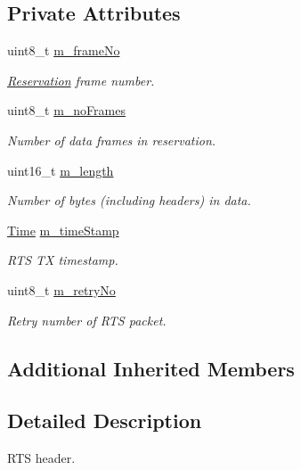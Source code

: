 \subsection*{Private Attributes}
\begin{DoxyCompactItemize}
\item 
uint8\+\_\+t \hyperlink{classns3_1_1UanHeaderRcRts_ad6ee10b951e81197f4258b85fb5958ee}{m\+\_\+frame\+No}
\begin{DoxyCompactList}\small\item\em \hyperlink{classns3_1_1Reservation}{Reservation} frame number. \end{DoxyCompactList}\item 
uint8\+\_\+t \hyperlink{classns3_1_1UanHeaderRcRts_a809efa819ec8e806c318b4a051206eea}{m\+\_\+no\+Frames}
\begin{DoxyCompactList}\small\item\em Number of data frames in reservation. \end{DoxyCompactList}\item 
uint16\+\_\+t \hyperlink{classns3_1_1UanHeaderRcRts_a036b4592b9361d1db621909351e6c217}{m\+\_\+length}
\begin{DoxyCompactList}\small\item\em Number of bytes (including headers) in data. \end{DoxyCompactList}\item 
\hyperlink{classns3_1_1Time}{Time} \hyperlink{classns3_1_1UanHeaderRcRts_af7cb4639a453a02f98bf46239ae8de6a}{m\+\_\+time\+Stamp}
\begin{DoxyCompactList}\small\item\em R\+TS TX timestamp. \end{DoxyCompactList}\item 
uint8\+\_\+t \hyperlink{classns3_1_1UanHeaderRcRts_a354a45a3ba84f035501821520a844e58}{m\+\_\+retry\+No}
\begin{DoxyCompactList}\small\item\em Retry number of R\+TS packet. \end{DoxyCompactList}\end{DoxyCompactItemize}
\subsection*{Additional Inherited Members}


\subsection{Detailed Description}
R\+TS header.

